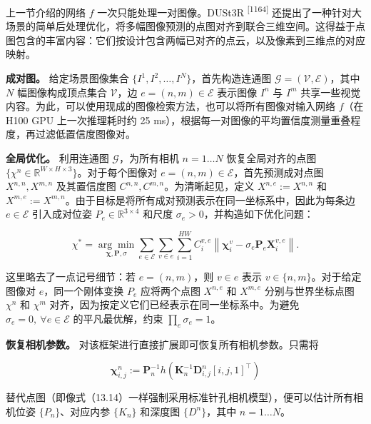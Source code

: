 上一节介绍的网络 $f$ 一次只能处理一对图像。DUSt3R \textsuperscript{[1164]} 还提出了一种针对大场景的简单后处理优化，将多幅图像预测的点图对齐到联合三维空间。这得益于点图包含的丰富内容：它们按设计包含两幅已对齐的点云，以及像素到三维点的对应映射。

\textbf{成对图。} 给定场景图像集合 $\{I^1,I^2,\ldots,I^N\}$，首先构造连通图 $\mathcal{G}=(\mathcal{V},\mathcal{E})$，其中 $N$ 幅图像构成顶点集合 $\mathcal{V}$，边 $e=(n,m)\in\mathcal{E}$ 表示图像 $I^n$ 与 $I^m$ 共享一些视觉内容。为此，可以使用现成的图像检索方法，也可以将所有图像对输入网络 $f$（在 H100 GPU 上一次推理耗时约 25 ms），根据每一对图像的平均置信度测量重叠程度，再过滤低置信度图像对。

\textbf{全局优化。} 利用连通图 $\mathcal{G}$，为所有相机 $n=1\ldots N$ 恢复全局对齐的点图 $\{\chi^n\in\mathbb{R}^{W\times H\times3}\}$。对于每个图像对 $e=(n,m)\in\mathcal{E}$，首先预测成对点图 $X^{n,n},X^{m,n}$ 及其置信度图 $C^{n,n},C^{m,n}$。为清晰起见，定义 $X^{n,e}:=X^{n,n}$ 和 $X^{m,e}:=X^{m,n}$。由于目标是将所有成对预测表示在同一坐标系中，因此为每条边 $e\in\mathcal{E}$ 引入成对位姿 $P_e\in\mathbb{R}^{3\times4}$ 和尺度 $\sigma_e>0$，并构造如下优化问题：

\begin{equation}
\chi^ {*} = \underset {\boldsymbol {\chi}, \boldsymbol {P}, \sigma} {\arg \min} \sum _ {e \in \mathcal {E}} \sum _ {v \in e} \sum _ {i = 1} ^ {H W} C _ {i} ^ {v, e} \left\| \boldsymbol {\chi} _ {i} ^ {v} - \sigma_ {e} \boldsymbol {P} _ {e} \boldsymbol {X} _ {i} ^ {v, e} \right\|.\tag{13.18}
\end{equation}

这里略去了一点记号细节：若 $e=(n,m)$，则 $v\in e$ 表示 $v\in\{n,m\}$。对于给定图像对 $e$，同一个刚体变换 $P_e$ 应将两个点图 $X^{n,e}$ 和 $X^{m,e}$ 分别与世界坐标点图 $\chi^n$ 和 $\chi^m$ 对齐，因为按定义它们已经表示在同一坐标系中。为避免 $\sigma_e=0,\ \forall e\in\mathcal{E}$ 的平凡最优解，约束 $\prod_e\sigma_e=1$。

\textbf{恢复相机参数。} 对该框架进行直接扩展即可恢复所有相机参数。只需将

\begin{equation*}
\boldsymbol {\chi} _ {i, j} ^ {n} := \boldsymbol {P} _ {n} ^ {- 1} h (\boldsymbol {K} _ {n} ^ {- 1} \boldsymbol {D} _ {i, j} ^ {n} [ i, j, 1 ] ^ {\top})
\end{equation*}

替代点图（即像式（13.14）一样强制采用标准针孔相机模型），便可以估计所有相机位姿 $\{P_n\}$、对应内参 $\{K_n\}$ 和深度图 $\{D^n\}$，其中 $n=1\ldots N$。

